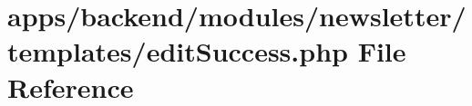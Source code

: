 \hypertarget{backend_2modules_2newsletter_2templates_2edit_success_8php}{\section{apps/backend/modules/newsletter/templates/edit\-Success.php File Reference}
\label{backend_2modules_2newsletter_2templates_2edit_success_8php}
}

